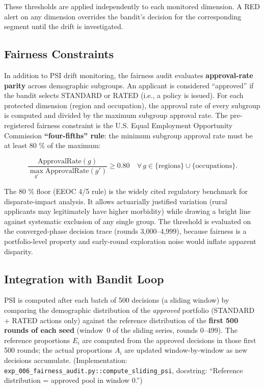 These thresholds are applied independently to each monitored dimension. A RED alert on any dimension overrides the bandit's decision for the corresponding segment until the drift is investigated.

\subsection{Fairness Constraints}\label{fairness-constraints}

In addition to PSI drift monitoring, the fairness audit evaluates \textbf{approval-rate parity} across demographic subgroups. An applicant is considered ``approved'' if the bandit selects STANDARD or RATED (i.e., a policy is issued). For each protected dimension (region and occupation), the approval rate of every subgroup is computed and divided by the maximum subgroup approval rate. The pre-registered fairness constraint is the U.S. Equal Employment Opportunity Commission \textbf{``four-fifths'' rule}: the minimum subgroup approval rate must be at least 80 \% of the maximum:

\[\frac{\text{ApprovalRate}(g)}{\max_{g'} \text{ApprovalRate}(g')} \ge 0.80 \quad \forall \, g \in \{\text{regions}\} \cup \{\text{occupations}\}.\]

The 80 \% floor (EEOC 4/5 rule) is the widely cited regulatory benchmark for disparate-impact analysis. It allows actuarially justified variation (rural applicants may legitimately have higher morbidity) while drawing a bright line against systematic exclusion of any single group. The threshold is evaluated on the converged-phase decision trace (rounds 3,000--4,999), because fairness is a portfolio-level property and early-round exploration noise would inflate apparent disparity.

\subsection{Integration with Bandit Loop}\label{integration-with-bandit-loop}

PSI is computed after each batch of 500 decisions (a sliding window) by comparing the demographic distribution of the \emph{approved} portfolio (STANDARD + RATED actions only) against the reference distribution of the \textbf{first 500 rounds of each seed} (window~0 of the sliding series, rounds 0--499). The reference proportions \(E_i\) are computed from the approved decisions in those first 500 rounds; the actual proportions \(A_i\) are updated window-by-window as new decisions accumulate. (Implementation: \texttt{exp\_006\_fairness\_audit.py::compute\_sliding\_psi}, docstring: ``Reference distribution = approved pool in window 0.'')

